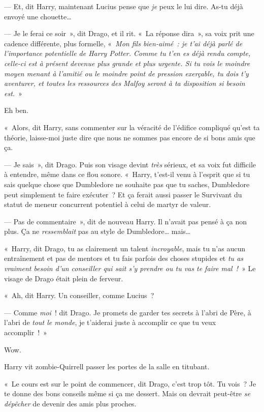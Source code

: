 --- Et, dit Harry, maintenant Lucius pense que \emph{je} peux le lui dire. As-tu déjà envoyé une chouette…

--- Je le ferai ce soir~», dit Drago, et il rit. «~La réponse dira~», sa voix prit une cadence différente, plus formelle, «~\emph{Mon fils bien-aimé~: je t'ai déjà parlé de l'importance potentielle de Harry Potter. Comme tu t'en es déjà rendu compte, celle-ci est à présent devenue plus grande et plus urgente. Si tu vois le moindre moyen menant à l'amitié ou le moindre point de pression exerçable, tu dois t'y aventurer, et toutes les ressources des Malfoy seront à ta disposition si besoin est.}~»

Eh ben.

«~Alors, dit Harry, sans commenter sur la véracité de l'édifice compliqué qu'est ta théorie, laisse-moi juste dire que nous ne sommes pas encore de si bons amis que ça.

--- Je sais~», dit Drago. Puis son visage devint \emph{très} sérieux, et sa voix fut difficile à entendre, même dans ce flou sonore. «~Harry, t'est-il venu à l'esprit que si tu sais quelque chose que Dumbledore ne souhaite pas que tu saches, Dumbledore peut simplement te faire exécuter~? Et ça ferait aussi passer le Survivant du statut de meneur concurrent potentiel à celui de martyr de valeur.

--- Pas de commentaire~», dit de nouveau Harry. Il n'avait pas pensé à ça non plus. Ça ne \emph{ressemblait} pas au style de Dumbledore… mais…

«~Harry, dit Drago, tu as clairement un talent \emph{incroyable}, mais tu n'as aucun entraînement et pas de mentors et tu fais parfois des choses stupides et \emph{tu as vraiment besoin d'un conseiller qui sait s'y prendre ou tu vas te faire mal~!}~» Le visage de Drago était plein de ferveur.

«~Ah, dit Harry. Un conseiller, comme Lucius~?

--- Comme \emph{moi}~! dit Drago. Je promets de garder tes secrets à l'abri de Père, à l'abri de \emph{tout le monde}, je t'aiderai juste à accomplir ce que tu veux accomplir~!~»

Wow.

Harry vit zombie-Quirrell passer les portes de la salle en titubant.

«~Le cours est sur le point de commencer, dit Drago, c'est trop tôt. Tu vois~? Je te donne des bons conseils même si ça me dessert. Mais on devrait peut-être \emph{se dépêcher} de devenir des amis plus proches.


